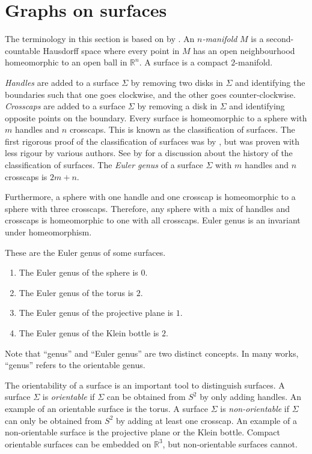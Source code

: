 \section{Graphs on surfaces}

The terminology in this section is based on  by \textcite{moharGraphsSurfaces2001}. An \textit{$n$-manifold} $M$ is a second-countable Hausdorff space where every point in $M$ has an open neighbourhood homeomorphic to an open ball in $\mathbb{R}^n$. A surface is a compact $2$-manifold. 

\textit{Handles} are added to a surface \(\Sigma\) by removing two disks in \(\Sigma\) and identifying the boundaries such that one goes clockwise, and the other goes counter-clockwise. \textit{Crosscaps} are added to a surface $\Sigma$ by removing a disk in \(\Sigma\) and identifying opposite points on the boundary. Every surface is homeomorphic to a sphere with $m$ handles and $n$ crosscaps. This is known as the classification of surfaces. The first rigorous proof of the classification of surfaces was by \textcite{brahanaSystemsCircuitsTwoDimensional1921}, but was proven with less rigour by various authors. See \cite{gallierClassificationTheoremCompact2013} by \citeauthor{gallierClassificationTheoremCompact2013} for a discussion about the history of the classification of surfaces. The \textit{Euler genus} of a surface \(\Sigma\) with $m$ handles and $n$ crosscaps is $2m + n$.

Furthermore, a sphere with one handle and one crosscap is homeomorphic to a sphere with three crosscaps. Therefore, any sphere with a mix of handles and crosscaps is homeomorphic to one with all crosscaps. Euler genus is an invariant under homeomorphism. 

These are the Euler genus of some surfaces.
\begin{enumerate}
	\item The Euler genus of the sphere is \(0\).
	\item The Euler genus of the torus is \(2\).
	\item The Euler genus of the projective plane is \(1\). 
	\item The Euler genus of the Klein bottle is \(2\). 
\end{enumerate}

Note that ``genus'' and ``Euler genus'' are two distinct concepts. In many works, ``genus'' refers to the orientable genus. 

The orientability of a surface is an important tool to distinguish surfaces. A surface \(\Sigma\) is \textit{orientable} if \(\Sigma\) can be obtained from \(S^2\) by only adding handles. An example of an orientable surface is the torus. A surface \(\Sigma\) is \textit{non-orientable} if \(\Sigma\) can only be obtained from \(S^2\) by adding at least one crosscap. An example of a non-orientable surface is the projective plane or the Klein bottle. Compact orientable surfaces can be embedded on $\mathbb{R}^3$, but non-orientable surfaces cannot.

